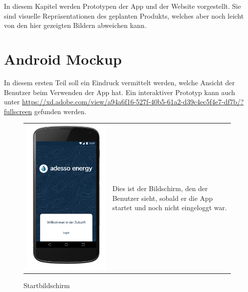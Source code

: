 In diesem Kapitel werden Prototypen der App und der Website vorgestellt. Sie sind visuelle Repräsentationen des geplanten Produkts, welches aber noch leicht von den hier gezeigten Bildern abweichen kann.

\section{Android Mockup}
In diesem ersten Teil soll ein Eindruck vermittelt werden, welche Ansicht der Benutzer beim Verwenden der App hat. Ein interaktiver Prototyp kann auch unter \url{https://xd.adobe.com/view/a94a6f16-527f-40b5-61a2-d39c4ec5f4e7-df7b/?fullscreen} gefunden werden.


\begin{figure}[h]
\begin{tabularx}{\textwidth}{X  X}
	\includegraphics[scale = 0.155]{img/AndroidMockup/splash}  \caption {Startbildschirm} &  Dies ist der Bildschirm, den der Benutzer sieht, sobald er die App startet und noch nicht eingeloggt war.\\

\end{tabularx}
\end{figure}

